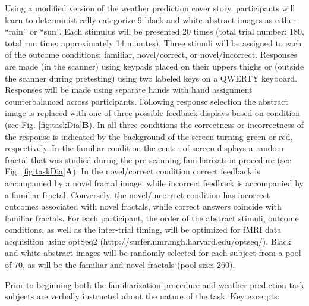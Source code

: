 \documentclass[doc]{apa}        %
\begin{document}
Using a modified version of the weather prediction cover story, participants will learn to deterministically categorize 9 black and white abstract images as either ``rain'' or ``sun''.  Each stimulus will be presented 20 times (total trial number: 180, total run time: approximately 14 minutes).   Three stimuli will be assigned to each of the outcome conditions: familiar, novel/correct, or novel/incorrect.  Responses are made (in the scanner) using keypads placed on their uppers thighs or (outside the scanner during pretesting) using two labeled keys on a QWERTY keyboard.  Responses will be made using separate hands with hand assignment counterbalanced across participants.  Following response selection the abstract image is replaced with one of three possible feedback displays based on condition (see Fig. \ref{fig:taskDia}\textbf{B}).  In all three conditions the correctness or incorrectness of the response is indicated by the background of the screen turning green or red, respectively.  In the familiar condition the center of screen displays a random fractal that was studied during the pre-scanning familiarization procedure (see Fig. \ref{fig:taskDia}\textbf{A}).  In the novel/correct condition correct feedback is accompanied by a novel fractal image, while incorrect feedback is accompanied by a familiar fractal.  Conversely, the novel/incorrect condition has incorrect outcomes associated with novel fractals, while correct answers coincide with familiar fractals.   For each participant, the order of the abstract stimuli, outcome conditions, as well as the inter-trial timing, will be optimized for fMRI data acquisition using optSeq2 (http://surfer.nmr.mgh.harvard.edu/optseq/).  Black and white abstract images will be randomly selected for each subject from a pool of 70, as will be the familiar and novel fractals (pool size: 260).  

Prior to beginning both the familiarization procedure and weather prediction task subjects are verbally instructed about the nature of the task.  Key excerpts:
\end{document}
